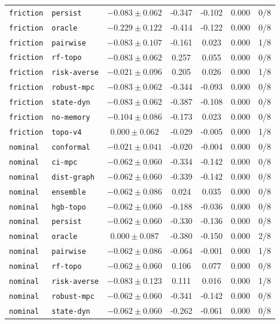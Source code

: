 \documentclass{article}
\begin{document}
\begin{center}
\begin{tabular}{llccccc}
\texttt{friction} & \texttt{persist} & $-0.083 \pm 0.062$ & -0.347 & -0.102 & 0.000 & 0/8 \\
\texttt{friction} & \texttt{oracle} & $-0.229 \pm 0.122$ & -0.414 & -0.122 & 0.000 & 0/8 \\
\texttt{friction} & \texttt{pairwise} & $-0.083 \pm 0.107$ & -0.161 & 0.023 & 0.000 & 1/8 \\
\texttt{friction} & \texttt{rf-topo} & $-0.083 \pm 0.062$ & 0.257 & 0.055 & 0.000 & 0/8 \\
\texttt{friction} & \texttt{risk-averse} & $-0.021 \pm 0.096$ & 0.205 & 0.026 & 0.000 & 1/8 \\
\texttt{friction} & \texttt{robust-mpc} & $-0.083 \pm 0.062$ & -0.344 & -0.093 & 0.000 & 0/8 \\
\texttt{friction} & \texttt{state-dyn} & $-0.083 \pm 0.062$ & -0.387 & -0.108 & 0.000 & 0/8 \\
\texttt{friction} & \texttt{no-memory} & $-0.104 \pm 0.086$ & -0.173 & 0.023 & 0.000 & 0/8 \\
\texttt{friction} & \texttt{topo-v4} & $0.000 \pm 0.062$ & -0.029 & -0.005 & 0.000 & 1/8 \\
\texttt{nominal} & \texttt{conformal} & $-0.021 \pm 0.041$ & -0.020 & -0.004 & 0.000 & 0/8 \\
\texttt{nominal} & \texttt{ci-mpc} & $-0.062 \pm 0.060$ & -0.334 & -0.142 & 0.000 & 0/8 \\
\texttt{nominal} & \texttt{dist-graph} & $-0.062 \pm 0.060$ & -0.339 & -0.142 & 0.000 & 0/8 \\
\texttt{nominal} & \texttt{ensemble} & $-0.062 \pm 0.086$ & 0.024 & 0.035 & 0.000 & 0/8 \\
\texttt{nominal} & \texttt{hgb-topo} & $-0.062 \pm 0.060$ & -0.188 & -0.036 & 0.000 & 0/8 \\
\texttt{nominal} & \texttt{persist} & $-0.062 \pm 0.060$ & -0.330 & -0.136 & 0.000 & 0/8 \\
\texttt{nominal} & \texttt{oracle} & $0.000 \pm 0.087$ & -0.380 & -0.150 & 0.000 & 2/8 \\
\texttt{nominal} & \texttt{pairwise} & $-0.062 \pm 0.086$ & -0.064 & -0.001 & 0.000 & 1/8 \\
\texttt{nominal} & \texttt{rf-topo} & $-0.062 \pm 0.060$ & 0.106 & 0.077 & 0.000 & 0/8 \\
\texttt{nominal} & \texttt{risk-averse} & $-0.083 \pm 0.123$ & 0.111 & 0.016 & 0.000 & 1/8 \\
\texttt{nominal} & \texttt{robust-mpc} & $-0.062 \pm 0.060$ & -0.341 & -0.142 & 0.000 & 0/8 \\
\texttt{nominal} & \texttt{state-dyn} & $-0.062 \pm 0.060$ & -0.262 & -0.061 & 0.000 & 0/8 \\
\bottomrule
\end{tabular}
\end{center}
\end{document}
